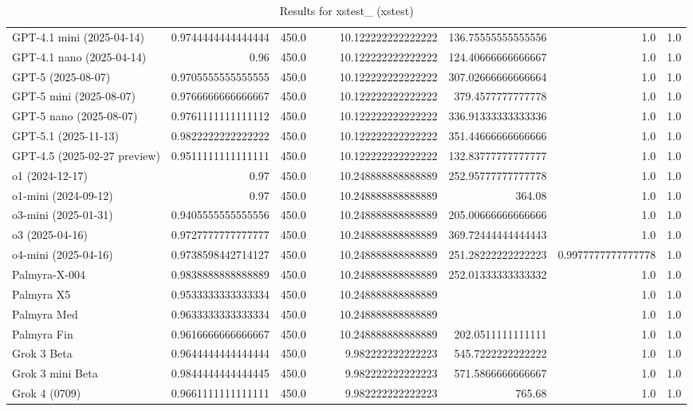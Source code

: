 \begin{table}[htp]
{\begin{tabular}{lrrrrrrrr}
GPT-4.1 mini (2025-04-14) & 0.9744444444444444 & 450.0 &  &  & 10.122222222222222 & 136.75555555555556 & 1.0 & 1.0 \\
GPT-4.1 nano (2025-04-14) & 0.96 & 450.0 &  &  & 10.122222222222222 & 124.40666666666667 & 1.0 & 1.0 \\
GPT-5 (2025-08-07) & 0.9705555555555555 & 450.0 &  &  & 10.122222222222222 & 307.02666666666664 & 1.0 & 1.0 \\
GPT-5 mini (2025-08-07) & 0.9766666666666667 & 450.0 &  &  & 10.122222222222222 & 379.4577777777778 & 1.0 & 1.0 \\
GPT-5 nano (2025-08-07) & 0.9761111111111112 & 450.0 &  &  & 10.122222222222222 & 336.91333333333336 & 1.0 & 1.0 \\
GPT-5.1 (2025-11-13) & 0.9822222222222222 & 450.0 &  &  & 10.122222222222222 & 351.44666666666666 & 1.0 & 1.0 \\
GPT-4.5 (2025-02-27 preview) & 0.9511111111111111 & 450.0 &  &  & 10.122222222222222 & 132.83777777777777 & 1.0 & 1.0 \\
o1 (2024-12-17) & 0.97 & 450.0 &  &  & 10.248888888888889 & 252.95777777777778 & 1.0 & 1.0 \\
o1-mini (2024-09-12) & 0.97 & 450.0 &  &  & 10.248888888888889 & 364.08 & 1.0 & 1.0 \\
o3-mini (2025-01-31) & 0.9405555555555556 & 450.0 &  &  & 10.248888888888889 & 205.00666666666666 & 1.0 & 1.0 \\
o3 (2025-04-16) & 0.9727777777777777 & 450.0 &  &  & 10.248888888888889 & 369.72444444444443 & 1.0 & 1.0 \\
o4-mini (2025-04-16) & 0.9738598442714127 & 450.0 &  &  & 10.248888888888889 & 251.28222222222223 & 0.9977777777777778 & 1.0 \\
Palmyra-X-004 & 0.9838888888888889 & 450.0 &  &  & 10.248888888888889 & 252.01333333333332 & 1.0 & 1.0 \\
Palmyra X5 & 0.9533333333333334 & 450.0 &  &  & 10.248888888888889 &  & 1.0 & 1.0 \\
Palmyra Med & 0.9633333333333334 & 450.0 &  &  & 10.248888888888889 &  & 1.0 & 1.0 \\
Palmyra Fin & 0.9616666666666667 & 450.0 &  &  & 10.248888888888889 & 202.0511111111111 & 1.0 & 1.0 \\
Grok 3 Beta & 0.9644444444444444 & 450.0 &  &  & 9.982222222222223 & 545.7222222222222 & 1.0 & 1.0 \\
Grok 3 mini Beta & 0.9844444444444445 & 450.0 &  &  & 9.982222222222223 & 571.5866666666667 & 1.0 & 1.0 \\
Grok 4 (0709) & 0.9661111111111111 & 450.0 &  &  & 9.982222222222223 & 765.68 & 1.0 & 1.0 \\
\bottomrule
\end{tabular}}
\caption{Results for xstest_ (xstest)}
\label{fig:xstest_ (xstest)}
\end{table}